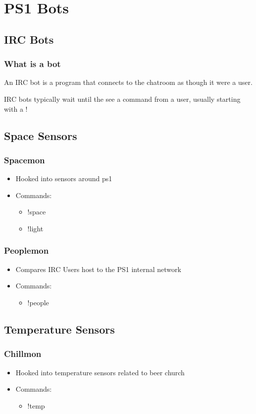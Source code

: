 \documentclass[hyperref={pdfpagelabels=false}]{beamer}
\begin{document}
\section{PS1 Bots}
	\subsection{IRC Bots}
		\frame
		{
			\frametitle{What is a bot}
			An IRC bot is a program that connects to the
			chatroom as though it were a user.

			IRC bots typically wait until the see a command
			from a user, usually starting with a !
		}
	\subsection{Space Sensors}
		\frame
		{
			\frametitle{Spacemon}
			\begin{itemize}
				\item{Hooked into sensors around ps1}
				\item{Commands:}
				\begin{itemize}
					\item{!space}
					\item{!light}
				\end{itemize}
			\end{itemize}
		}
		\frame
		{
			\frametitle{Peoplemon}
			\begin{itemize}
				\item{Compares IRC Users host to the PS1
					internal network}
				\item{Commands:}
				\begin{itemize}
					\item{!people}
				\end{itemize}
			\end{itemize}
		}
	\subsection{Temperature Sensors}
		\frame
		{
			\frametitle{Chillmon}
			\begin{itemize}
				\item{Hooked into temperature sensors related
					to beer church}
				\item{Commands:}
				\begin{itemize}
					\item{!temp}
				\end{itemize}
			\end{itemize}
		}
\end{document}
